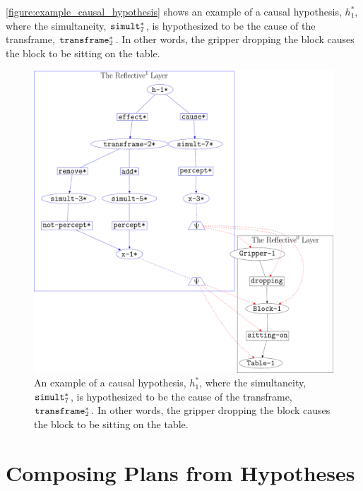 {\mbox{\autoref{figure:example_causal_hypothesis}}} shows an example
of a causal hypothesis, $h_1^*$, where the simultaneity,
$\text{\tt{simult}}_7^*$, is hypothesized to be the cause of the
transframe, $\text{\tt{transframe}}_2^*$.  In other words, the gripper
dropping the block causes the block to be sitting on the table.
\begin{figure}
\center
\includegraphics[width=12cm]{gfx/example_causal_hypothesis}
\caption[An example of a causal hypothesis.]{An example of a causal
  hypothesis, $h_1^*$, where the simultaneity,
  $\text{\tt{simult}}_7^*$, is hypothesized to be the cause of the
  transframe, $\text{\tt{transframe}}_2^*$.  In other words, the
  gripper dropping the block causes the block to be sitting on the
  table.}
\label{figure:example_causal_hypothesis}
\end{figure}

\section{Composing Plans from Hypotheses}

